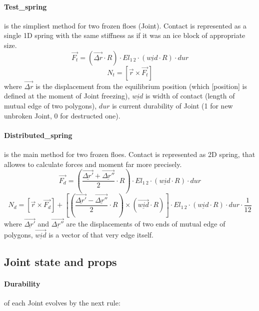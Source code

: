 \paragraph{Test\_spring} is the simpliest method for two frozen 
floes (Joint). Contact is represented as a single 1D spring with 
the same stiffness as if it was an ice block of appropriate size.
\begin{equation}
 \vec{F_t} = (\underline{\vec{\Delta r}} \cdot R) \cdot El_{1\ 2} \cdot (\underline{wid} \cdot R) \cdot dur 
\end{equation}
\begin{equation}
 N_t = [\vec{r} \times \vec{F_t}]
\end{equation}
where $\underline{\vec{\Delta r}}$ is the displacement from the 
equilibrium position (which [position] is defined at the moment of
Joint freezing), $\underline{wid}$ is width of contact (length of 
mutual edge of two polygons), $dur$ is current durability of Joint
(1 for new unbroken Joint, 0 for destructed one).

\paragraph{Distributed\_spring} is the main method for two frozen
floes. Contact is represented as 2D spring, that allowes to calculate
forces and moment far more precisely.
\begin{equation}
 \vec{F_d} = (\frac{\underline{\vec{\Delta r'}}+\underline{\vec{\Delta r''}}}{2} \cdot R) \cdot 
 El_{1\ 2} \cdot (\underline{wid} \cdot R) \cdot dur
\end{equation}
\begin{equation}
 N_d = [\vec{r} \times \vec{F_d}] + 
 [(\frac{\underline{\vec{\Delta r'}}-\underline{\vec{\Delta r''}}}{2} \cdot R) \times (\underline{\vec{wid}} \cdot R)] 
 \cdot El_{1\ 2} \cdot (\underline{wid} \cdot R) \cdot dur \cdot \frac{1}{12}
\end{equation}
where $\underline{\vec{\Delta r'}}$ and $\underline{\vec{\Delta r''}}$
are the displacements of two ends of mutual edge of polygons, 
$\underline{\vec{wid}}$ is a vector of that very edge itself.

\subsection{Joint state and props}

\paragraph{Durability} of each Joint evolves by the next rule:

